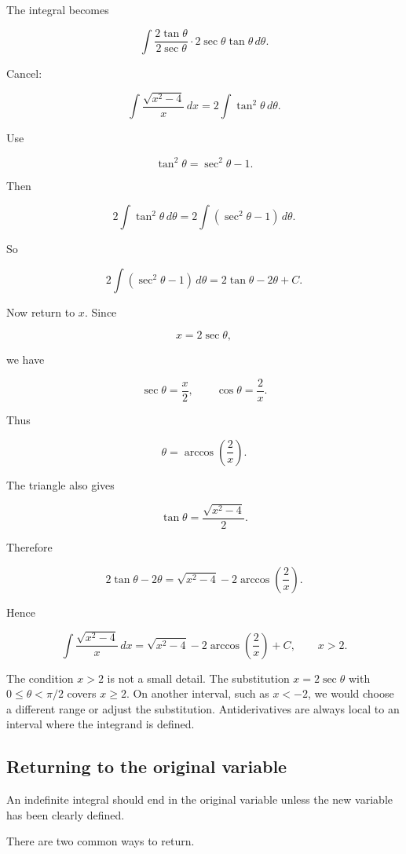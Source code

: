 The integral becomes

\[
\int
\frac{2\tan\theta}{2\sec\theta}
\cdot
2\sec\theta\tan\theta\,d\theta.
\]

Cancel:

\[
\int \frac{\sqrt{x^2-4}}{x}\,dx
=
2\int \tan^2\theta\,d\theta.
\]

Use

\[
\tan^2\theta=\sec^2\theta-1.
\]

Then

\[
2\int \tan^2\theta\,d\theta
=
2\int(\sec^2\theta-1)\,d\theta.
\]

So

\[
2\int(\sec^2\theta-1)\,d\theta
=
2\tan\theta-2\theta+C.
\]

Now return to \(x\).  Since

\[
x=2\sec\theta,
\]

we have

\[
\sec\theta=\frac{x}{2},
\qquad
\cos\theta=\frac{2}{x}.
\]

Thus

\[
\theta=\arccos\left(\frac{2}{x}\right).
\]

The triangle also gives

\[
\tan\theta=\frac{\sqrt{x^2-4}}{2}.
\]

Therefore

\[
2\tan\theta-2\theta
=
\sqrt{x^2-4}
-
2\arccos\left(\frac{2}{x}\right).
\]

Hence

\[
\boxed{
\int \frac{\sqrt{x^2-4}}{x}\,dx
=
\sqrt{x^2-4}
-
2\arccos\left(\frac{2}{x}\right)
+C,
\qquad x>2.
}
\]

The condition \(x>2\) is not a small detail.  The substitution \(x=2\sec\theta\) with
\(0\le\theta<\pi/2\) covers \(x\ge2\).  On another interval, such as \(x<-2\), we would
choose a different range or adjust the substitution.  Antiderivatives are always local to an
interval where the integrand is defined.

\subsection{Returning to the original variable}
\label{subsec:returning-original-variable}

An indefinite integral should end in the original variable unless the new variable has
been clearly defined.

There are two common ways to return.


